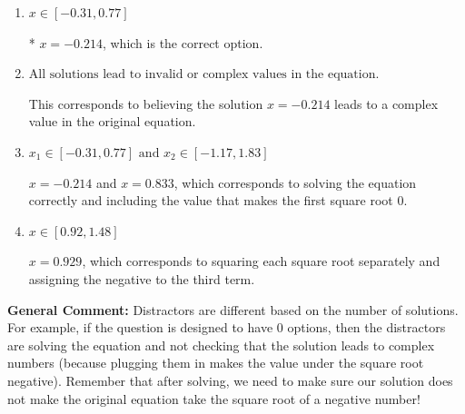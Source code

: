 \documentclass{extbook}[14pt]
\begin{document}
\begin{enumerate}
{\begin{enumerate}[label=\Alph*.]
$x = -1.000$ and $x = 0.833$, which corresponds to solving each radical separately for 0.
\item \( x \in [-0.31,0.77] \)

* $x = -0.214$, which is the correct option.
\item \( \text{All solutions lead to invalid or complex values in the equation.} \)

This corresponds to believing the solution $x = -0.214$ leads to a complex value in the original equation.
\item \( x_1 \in [-0.31, 0.77] \text{ and } x_2 \in [-1.17,1.83] \)

$x = -0.214$ and $x = 0.833$, which corresponds to solving the equation correctly and including the value that makes the first square root 0.
\item \( x \in [0.92,1.48] \)

$x = 0.929$, which corresponds to squaring each square root separately and assigning the negative to the third term.
\end{enumerate}

\textbf{General Comment:} Distractors are different based on the number of solutions. For example, if the question is designed to have 0 options, then the distractors are solving the equation and not checking that the solution leads to complex numbers (because plugging them in makes the value under the square root negative). Remember that after solving, we need to make sure our solution does not make the original equation take the square root of a negative number!
}
\end{enumerate}
\end{document}
